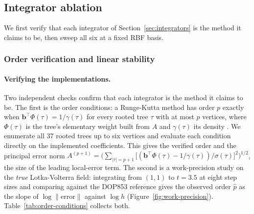 \subsection{Integrator ablation}
\label{sec:solver-results}

We first verify that each integrator of Section~\ref{sec:integrators} is the
method it claims to be, then sweep all six at a fixed RBF basis.

\subsubsection{Order verification and linear stability}

\paragraph{Verifying the implementations.} Two independent checks confirm
that each integrator is the method it claims to be. The first is the order
conditions: a Runge-Kutta method has order $p$ exactly when
$\mathbf{b}^\top\Phi(\tau)=1/\gamma(\tau)$ for every rooted tree $\tau$ with at most
$p$ vertices, where $\Phi(\tau)$ is the tree's elementary weight built from
$A$ and $\gamma(\tau)$ its density \cite{hairer1993solving}. We enumerate all
37 rooted trees up to six vertices and evaluate each condition directly on
the implemented coefficients. This gives the verified order and the principal
error norm $A^{(p+1)}=\big(\sum_{|\tau|=p+1}\big[(\mathbf{b}^\top\Phi(\tau)-1/\gamma(\tau))/\sigma(\tau)\big]^2\big)^{1/2}$,
the size of the leading local-error term. The second is a work-precision study on
the \emph{true} Lotka-Volterra field: integrating from $(1,1)$ to $t=3.5$ at
eight step sizes and comparing against the DOP853 reference gives the
observed order $\hat p$ as the slope of $\log\|\text{error}\|$ against
$\log h$ (Figure~\ref{fig:work-precision}). Table~\ref{tab:order-conditions}
collects both.

